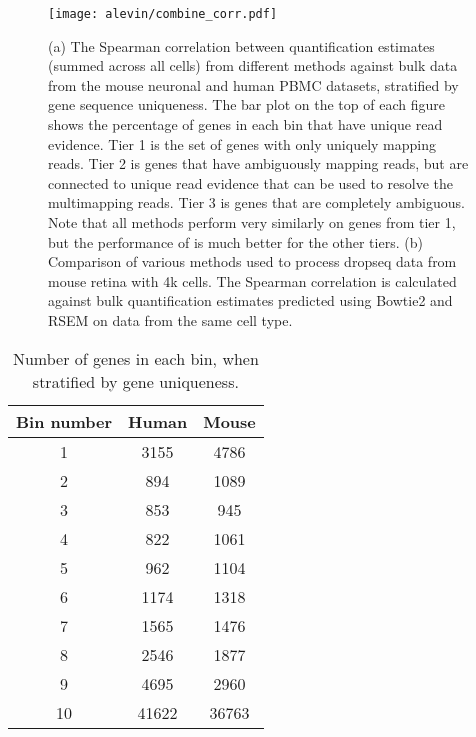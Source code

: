 \begin{figure}
\centering
    \texttt{[image: alevin/combine\_corr.pdf]}
  \caption{(a) The Spearman correlation between quantification estimates (summed across all cells) from different \scrnaseq methods against bulk data from the mouse neuronal and human PBMC datasets, stratified by gene sequence uniqueness. The bar plot on the top of each figure shows the percentage of genes in each bin that have unique read evidence. Tier 1 is the set of genes with only uniquely mapping reads. Tier 2 is genes that have ambiguously mapping reads, but are connected to unique read evidence that can be used to resolve the multimapping reads. Tier 3 is  genes that are completely ambiguous. Note that all methods perform very similarly on genes from tier 1, but the performance of \alevin is much better for the other tiers. (b) Comparison of various methods used to process dropseq data from mouse retina with 4k cells. The Spearman correlation is calculated against bulk quantification estimates predicted using Bowtie2 and RSEM on data from the same cell type.}
  \label{fig:correlation}
\end{figure}

\begin{table}[htb]
\centering
\caption{Number of genes in each bin, when stratified by gene uniqueness.}
      \begin{tabular}{ccc}
        \hline
           Bin number & Human  & Mouse \\ \hline
    1 & 3155 & 4786 \\
    2 & 894 & 1089 \\
    3 & 853 & 945 \\
    4 & 822 & 1061 \\
    5 & 962 & 1104 \\
    6 & 1174 & 1318 \\
    7 & 1565 & 1476 \\     
    8 & 2546 & 1877 \\ 
    9 & 4695 & 2960 \\ 
    10 & 41622 & 36763 \\ \hline
      \end{tabular}
      \label{suptab:bin_sizes}
\end{table}

